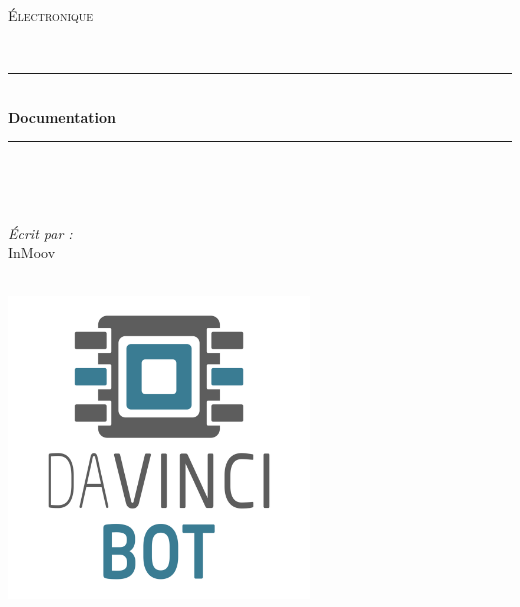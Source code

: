 \documentclass[12pt, oneside]{report}
\title{\titre}
\author{\auteur}
\date{\today}
\newcommand{\thedate}{}	%
\newcommand{\auteur}{InMoov}	%
\newcommand{\titre}{Documentation}
\newcommand{\typeDoc}{Électronique}
\begin{document}
\begin{titlepage}
	\centering
    \vspace*{0.5 cm}
\begin{center}    \textsc{\Large   \typeDoc}\\[2.0 cm]	\end{center}%
	\textsc{\Large \thedate  }\\[0.5 cm]				%
	\rule{\linewidth}{0.2 mm} \\[0.4 cm]
	{ \huge \bfseries \titre}\\
	\rule{\linewidth}{0.2 mm} \\[1.5 cm]
	
	\begin{minipage}{0.4\textwidth}
		\begin{flushleft} \large
			\end{flushleft}
			\end{minipage}~
			\begin{minipage}{0.4\textwidth}
            
			\begin{flushright} \large
			\emph{Écrit par :} \\
			\auteur  
		\end{flushright}
           
	\end{minipage}\\[2 cm]
	
	\includegraphics[width=8cm]{img_template/DVB_Square.png}

\end{titlepage}

\tableofcontents
\end{document}
